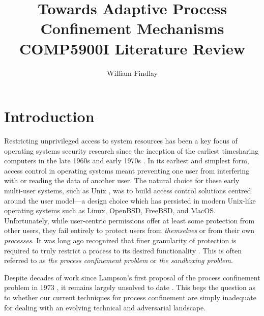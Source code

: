 \documentclass[dvipsnames, 12pt]{article}
\title{\huge Towards Adaptive Process Confinement
Mechanisms\\{\large COMP5900I Literature Review}}
\author{William Findlay}
\begin{document}
\maketitle
\thispagestyle{empty}


\vfill
\begin{abstract}
\end{abstract}
\vfill
\vfill

\clearpage

\setcounter{page}{1}


\section{Introduction}

Restricting unprivileged access to system resources has been a key focus of
operating systems security research since the inception of the earliest
timesharing computers in the late 1960s and early 1970s . In its
earliest and simplest form, access control in operating systems meant preventing
one user from interfering with or reading the data of another user. The natural
choice for these early multi-user systems, such as Unix \cite{ritchie1973_unix},
was to build access control solutions centred around the user model---a design
choice which has persisted in modern Unix-like operating systems such as Linux,
OpenBSD, FreeBSD, and MacOS. Unfortunately, while user-centric permissions offer
at least some protection from other users, they fail entirely to protect users
from \textit{themselves} or from their own \textit{processes}.  It was long ago
recognized that finer granularity of protection is required to truly restrict
a process to its desired functionality \cite{lampson1973_a_note}. This is often
referred to as \textit{the process confinement problem} or \textit{the
sandboxing problem}.

Despite decades of work since Lampson's first proposal of the process
confinement problem in 1973 \cite{lampson1973_a_note}, it remains largely
unsolved to date \cite{crowell2013_confinement_problem}. This begs the question
as to whether our current techniques for process confinement are simply
inadequate for dealing with an evolving technical and adversarial landscape.
\end{document}
